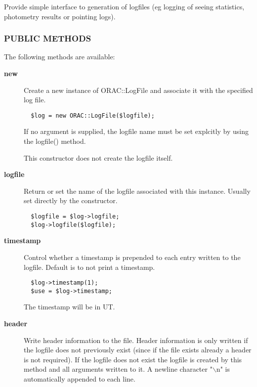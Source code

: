 \begin{description}
\begin{description}
Provide simple interface to generation of logfiles (eg logging
of seeing statistics, photometry results or pointing logs).

\subsubsection*{PUBLIC METHODS\label{ORAC::LogFile_PUBLIC_METHODS}}


The following methods are available:

\begin{description}

\item[{\textbf{new}}] \mbox{}

Create a new instance of ORAC::LogFile and associate it with the
specified log file.

\begin{verbatim}
  $log = new ORAC::LogFile($logfile);
\end{verbatim}


If no argument is supplied, the logfile name must be set explcitly
by using the logfile() method.



This constructor does not create the logfile itself.


\item[{\textbf{logfile}}] \mbox{}

Return or set the name of the logfile associated with
this instance. Usually set directly by the constructor.

\begin{verbatim}
  $logfile = $log->logfile;
  $log->logfile($logfile);
\end{verbatim}

\item[{\textbf{timestamp}}] \mbox{}

Control whether a timestamp is prepended to each entry
written to the logfile. Default is to not print a timestamp.

\begin{verbatim}
  $log->timestamp(1);
  $use = $log->timestamp;
\end{verbatim}


The timestamp will be in UT.


\item[{\textbf{header}}] \mbox{}

Write header information to the file. Header information is only
written if the logfile does not previously exist (since if the file
exists already a header is not required). If the logfile does not
exist the logfile is created by this method and all arguments written
to it.  A newline character "$\backslash$n" is automatically appended to each
line.


\end{description}
\end{description}
\end{description}
